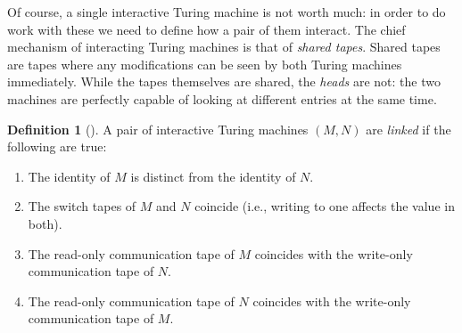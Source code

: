 \documentclass[english,12pt]{reedthesis}
\theoremstyle{plain}
\theoremstyle{definition}
\newtheorem{defn}[defn]{Definition}
\theoremstyle{remark}
\begin{document}
Of course, a single interactive Turing machine is not worth much: in order to do
work with these we need to define how a pair of them interact. The chief
mechanism of interacting Turing machines is that of \emph{shared
  tapes}. Shared tapes are tapes where any modifications can
be seen by both Turing machines immediately. While the tapes themselves are
shared, the \emph{heads} are not: the two machines are perfectly capable of
looking at different entries at the same time.

\begin{defn}[{\cite[Def.\ 4.2.2]{Go01}}]\label{def:linked-tms}
  A pair of interactive Turing machines $(M, N)$ are \emph{linked} if the
  following are true:
  \begin{enumerate}
    \item The identity of $M$ is distinct from the identity of $N$.
    \item The switch tapes of $M$ and $N$ coincide (i.e., writing to one affects
          the value in both).
    \item The read-only communication tape of $M$ coincides with the write-only
          communication tape of $N$.
    \item The read-only communication tape of $N$ coincides with the write-only
          communication tape of $M$.
  \end{enumerate}
\end{defn}
\end{document}
